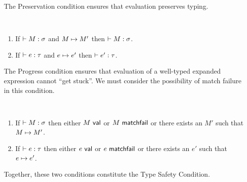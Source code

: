 The Preservation condition ensures that evaluation preserves typing.
\begingroup
\def\thetheorem{\ref{condition:preservation-P}}
\begin{condition}[Preservation] ~
\begin{enumerate}
\item If $\vdash M : \sigma$ and $M \mapsto M'$ then $\vdash M : \sigma$.
\item If $\vdash e : \tau$ and $e \mapsto e'$ then $\vdash e' : \tau$.
\end{enumerate}
\end{condition}
\endgroup

The Progress condition ensures that evaluation of a well-typed expanded expression cannot ``get stuck''. We must consider the possibility of match failure in this condition.
\begingroup
\def\thetheorem{\ref{condition:progress-P}}
\begin{condition}[Progress] ~
\begin{enumerate}
\item If $\vdash M : \sigma$ then either $M~\mathsf{val}$ or $M~\mathsf{matchfail}$ or there exists an $M'$ such that $M \mapsto M'$.
\item If $\vdash e : \tau$ then either $e~\mathsf{val}$ or $e~\mathsf{matchfail}$ or there exists an $e'$ such that $e \mapsto e'$.
\end{enumerate}
\end{condition}
\endgroup

Together, these two conditions constitute the Type Safety Condition.

